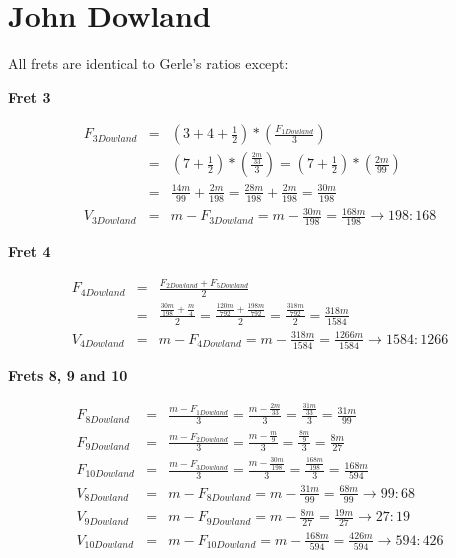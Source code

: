 \section{John Dowland}

All frets are identical to Gerle's ratios except:

\textbf{Fret 3}

\begin{eqnarray*}
    F_{3Dowland}
        &=& ( 3 + 4 + \frac{1}{2} ) * ( \frac{F_{1Dowland}}{3} ) \\
        &=& ( 7 + \frac{1}{2} ) * ( \frac{\frac{2m}{33}}{3} )
        = ( 7 + \frac{1}{2} ) * ( \frac{2m}{99} ) \\
        &=& \frac{14m}{99} + \frac{2m}{198}
        = \frac{28m}{198} + \frac{2m}{198}
        = \frac{30m}{198} \\
    V_{3Dowland}
        &=& m - F_{3Dowland}
        = m - \frac{30m}{198}
        = \frac{168m}{198}
        \to 198:168
\end{eqnarray*}

\textbf{Fret 4}

\begin{eqnarray*}
    F_{4Dowland}
        &=& \frac{F_{2Dowland} + F_{5Dowland}}{2} \\
        &=& \frac{\frac{30m}{198} + \frac{m}{4}}{2}
        = \frac{\frac{120m}{792} + \frac{198m}{792}}{2}
        = \frac{\frac{318m}{792}}{2}
        = \frac{318m}{1584} \\
    V_{4Dowland}
        &=& m - F_{4Dowland}
        = m - \frac{318m}{1584}
        = \frac{1266m}{1584}
        \to 1584:1266
\end{eqnarray*}

\textbf{Frets 8, 9 and 10}

\begin{eqnarray*}
    F_{8Dowland}
        &=& \frac{m-F_{1Dowland}}{3}
        = \frac{m - \frac{2m}{33}}{3}
        = \frac{\frac{31m}{33}}{3}
        = \frac{31m}{99} \\
    F_{9Dowland}
        &=& \frac{m-F_{2Dowland}}{3}
        = \frac{m - \frac{m}{9}}{3}
        = \frac{\frac{8m}{9}}{3}
        = \frac{8m}{27} \\
    F_{10Dowland}
        &=& \frac{m-F_{3Dowland}}{3}
        = \frac{m - \frac{30m}{198}}{3}
        =\frac{\frac{168m}{198}}{3}
        =\frac{168m}{594} \\
    V_{8Dowland}
        &=& m - F_{8Dowland}
        = m - \frac{31m}{99}
        = \frac{68m}{99}
        \to 99:68 \\
    V_{9Dowland}
        &=& m - F_{9Dowland}
        = m - \frac{8m}{27}
        = \frac{19m}{27}
        \to 27:19 \\
    V_{10Dowland}
        &=& m - F_{10Dowland}
        = m - \frac{168m}{594}
        = \frac{426m}{594}
        \to 594:426
\end{eqnarray*}

